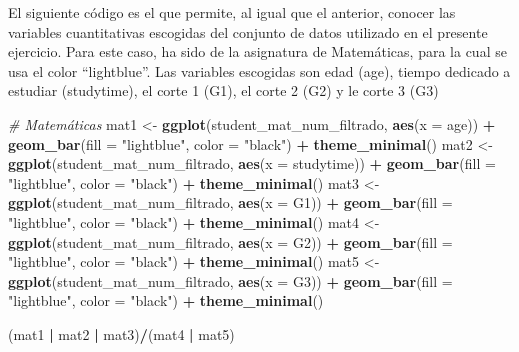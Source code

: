 \documentclass[
]{article}
\newenvironment{Shaded}{\begin{snugshade}}{\end{snugshade}}
\newcommand{\AttributeTok}[1]{\textcolor[rgb]{0.13,0.29,0.53}{#1}}
\newcommand{\CommentTok}[1]{\textcolor[rgb]{0.56,0.35,0.01}{\textit{#1}}}
\newcommand{\FunctionTok}[1]{\textcolor[rgb]{0.13,0.29,0.53}{\textbf{#1}}}
\newcommand{\NormalTok}[1]{#1}
\newcommand{\OtherTok}[1]{\textcolor[rgb]{0.56,0.35,0.01}{#1}}
\newcommand{\SpecialCharTok}[1]{\textcolor[rgb]{0.81,0.36,0.00}{\textbf{#1}}}
\newcommand{\StringTok}[1]{\textcolor[rgb]{0.31,0.60,0.02}{#1}}
\begin{document}
El siguiente código es el que permite, al igual que el anterior, conocer
las variables cuantitativas escogidas del conjunto de datos utilizado en
el presente ejercicio. Para este caso, ha sido de la asignatura de
Matemáticas, para la cual se usa el color ``lightblue''. Las variables
escogidas son edad (age), tiempo dedicado a estudiar (studytime), el
corte 1 (G1), el corte 2 (G2) y le corte 3 (G3)

\begin{Shaded}
\begin{Highlighting}[]
\CommentTok{\# Matemáticas}
\NormalTok{mat1 }\OtherTok{\textless{}{-}} \FunctionTok{ggplot}\NormalTok{(student\_mat\_num\_filtrado, }\FunctionTok{aes}\NormalTok{(}\AttributeTok{x =}\NormalTok{ age)) }\SpecialCharTok{+} \FunctionTok{geom\_bar}\NormalTok{(}\AttributeTok{fill =} \StringTok{"lightblue"}\NormalTok{, }\AttributeTok{color =} \StringTok{"black"}\NormalTok{) }\SpecialCharTok{+} \FunctionTok{theme\_minimal}\NormalTok{()}
\NormalTok{mat2 }\OtherTok{\textless{}{-}} \FunctionTok{ggplot}\NormalTok{(student\_mat\_num\_filtrado, }\FunctionTok{aes}\NormalTok{(}\AttributeTok{x =}\NormalTok{ studytime)) }\SpecialCharTok{+} \FunctionTok{geom\_bar}\NormalTok{(}\AttributeTok{fill =} \StringTok{"lightblue"}\NormalTok{, }\AttributeTok{color =} \StringTok{"black"}\NormalTok{) }\SpecialCharTok{+} \FunctionTok{theme\_minimal}\NormalTok{()}
\NormalTok{mat3 }\OtherTok{\textless{}{-}} \FunctionTok{ggplot}\NormalTok{(student\_mat\_num\_filtrado, }\FunctionTok{aes}\NormalTok{(}\AttributeTok{x =}\NormalTok{ G1)) }\SpecialCharTok{+} \FunctionTok{geom\_bar}\NormalTok{(}\AttributeTok{fill =} \StringTok{"lightblue"}\NormalTok{, }\AttributeTok{color =} \StringTok{"black"}\NormalTok{) }\SpecialCharTok{+} \FunctionTok{theme\_minimal}\NormalTok{()}
\NormalTok{mat4 }\OtherTok{\textless{}{-}} \FunctionTok{ggplot}\NormalTok{(student\_mat\_num\_filtrado, }\FunctionTok{aes}\NormalTok{(}\AttributeTok{x =}\NormalTok{ G2)) }\SpecialCharTok{+} \FunctionTok{geom\_bar}\NormalTok{(}\AttributeTok{fill =} \StringTok{"lightblue"}\NormalTok{, }\AttributeTok{color =} \StringTok{"black"}\NormalTok{) }\SpecialCharTok{+} \FunctionTok{theme\_minimal}\NormalTok{()}
\NormalTok{mat5 }\OtherTok{\textless{}{-}} \FunctionTok{ggplot}\NormalTok{(student\_mat\_num\_filtrado, }\FunctionTok{aes}\NormalTok{(}\AttributeTok{x =}\NormalTok{ G3)) }\SpecialCharTok{+} \FunctionTok{geom\_bar}\NormalTok{(}\AttributeTok{fill =} \StringTok{"lightblue"}\NormalTok{, }\AttributeTok{color =} \StringTok{"black"}\NormalTok{) }\SpecialCharTok{+} \FunctionTok{theme\_minimal}\NormalTok{()}

\NormalTok{(mat1 }\SpecialCharTok{|}\NormalTok{ mat2 }\SpecialCharTok{|}\NormalTok{ mat3)}\SpecialCharTok{/}\NormalTok{(mat4 }\SpecialCharTok{|}\NormalTok{ mat5)}
\end{Highlighting}
\end{Shaded}
\end{document}
